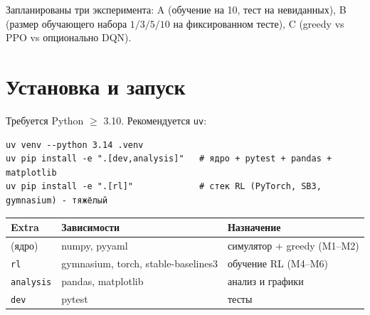 \documentclass[11pt,a4paper]{article}
\newcommand{\code}[1]{\texttt{#1}}
\begin{document}
Запланированы три эксперимента: A (обучение на 10, тест на невиданных),
B (размер обучающего набора $1/3/5/10$ на фиксированном тесте),
C (greedy vs PPO vs опционально DQN).

\section{Установка и запуск}
Требуется Python $\geq$ 3.10. Рекомендуется \code{uv}:

\begin{lstlisting}[style=plain]
uv venv --python 3.14 .venv
uv pip install -e ".[dev,analysis]"   # ядро + pytest + pandas + matplotlib
uv pip install -e ".[rl]"             # стек RL (PyTorch, SB3, gymnasium) - тяжёлый
\end{lstlisting}

\begin{center}
\begin{tabular}{@{}lll@{}}
\toprule
\textbf{Extra} & \textbf{Зависимости} & \textbf{Назначение} \\
\midrule
(ядро) & numpy, pyyaml & симулятор + greedy (M1--M2) \\
\code{rl} & gymnasium, torch, stable-baselines3 & обучение RL (M4--M6) \\
\code{analysis} & pandas, matplotlib & анализ и графики \\
\code{dev} & pytest & тесты \\
\bottomrule
\end{tabular}
\end{center}

\end{document}
